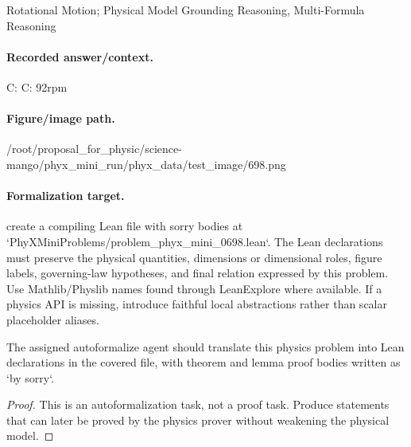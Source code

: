 Rotational Motion; Physical Model Grounding Reasoning, Multi-Formula Reasoning

\paragraph{Recorded answer/context.}
C: C: 92rpm

\paragraph{Figure/image path.}
/root/proposal\_for\_physic/science-mango/phyx\_mini\_run/phyx\_data/test\_image/698.png

\paragraph{Formalization target.}
create a compiling Lean file with sorry bodies at `PhyXMiniProblems/problem\_phyx\_mini\_0698.lean`. The Lean declarations must preserve the physical quantities, dimensions or dimensional roles, figure labels, governing-law hypotheses, and final relation expressed by this problem.
Use Mathlib/Physlib names found through LeanExplore where available. If a physics API is missing, introduce faithful local abstractions rather than scalar placeholder aliases.

\begin{theorem}
\label{thm:physics:phyx_mini_0698:target}
The assigned autoformalize agent should translate this physics problem into Lean declarations in the covered file, with theorem and lemma proof bodies written as `by sorry`.
\end{theorem}
\begin{proof}
This is an autoformalization task, not a proof task. Produce statements that can later be proved by the physics prover without weakening the physical model.
\end{proof}

